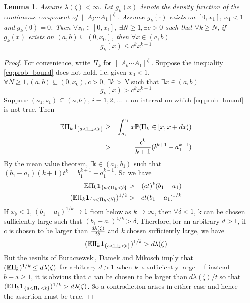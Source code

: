 \documentclass{article}
\newtheorem{lemma}{Lemma}
\theoremstyle{remark}
\begin{document}
\begin{lemma}\label{lemma:prob_bound}
  Assume $\lambda(\zeta) < \infty$. Let $g_k(x)$ denote the density
  function of the continuous component of $\|A_k \cdots A_1\|^\zeta$.
  Assume $g_k(\cdot)$ exists on $[0, x_1]$, $x_1 < 1$ and $g_k(0) = 0$.
  Then $\forall x_0 \in [0, x_1]$, $\exists N \geq 1, \exists c > 0$
  such that $\forall k \geq N$, if $g_k(x)$ exists on $(a, b)
  \subseteq (0, x_0)$, then $\forall x \in (a, b)$
  \begin{equation}
    \label{eq:prob_bound}
    g_k(x) \leq c^k x^{k-1}
  \end{equation}
\end{lemma}

\begin{proof}
  For convenience, write $\Pi_k$ for $\|A_k \cdots A_1\|^\zeta$. Suppose
  the inequality \eqref{eq:prob_bound} does not hold, i.e. given
  $x_0 < 1$, $\forall N \geq 1, (a, b) \subseteq (0, x_0), c
  > 0$, $\exists k > N$ such that $\exists x \in  (a, b)$
  \begin{equation*}
    g_k(x) > c^k x^{k-1}
  \end{equation*}
  Suppose $(a_1, b_1) \subseteq (a, b)$, $i = 1, 2, \dots$ is
  an interval on which \eqref{eq:prob_bound} is not true. Then
  \begin{eqnarray*}
    \mathbb{E} \Pi_k \mathbf{1}_{\{a < \Pi_k < b\}} &\geq&
    \int_{a_1}^{b_1} x \mathbb{P}(\Pi_k \in [x, x+dx)) \\
    &>& {c^k \over k + 1} (b_1^{k+1} - a_1^{k+1})
  \end{eqnarray*}
  By the mean value theorem, $\exists t \in (a_1, b_1)$ such that
  $(b_1 - a_1)(k+1) t^k = b_1^{k+1} - a_1^{k+1}$. So we have
  \begin{eqnarray*}
    \mathbb{E} \Pi_k \mathbf{1}_{\{a < \Pi_k < b\}} &>& (c t)^k(b_1 - a_1) \\
    (\mathbb{E} \Pi_k \mathbf{1}_{\{a < \Pi_k < b\}})^{1/k} &>& c t (b_1 - a_1)^{1/k}
  \end{eqnarray*}
  If $x_0 < 1$, $(b_1 - a_1)^{1/k} \to 1$ from below as $k \to
  \infty$, then $\forall \delta < 1$, k can be chosen sufficiently
  large such that $(b_1 - a_1)^{1/k} > \delta$. Therefore, for an arbitrary
  $d > 1$, if $c$ is chosen to be larger than ${d\lambda(\zeta) \over
    t \delta}$ and $k$ chosen sufficiently large, we have
  \[
  (\mathbb{E} \Pi_k \mathbf{1}_{\{a < \Pi_k < b\}})^{1/k} > d \lambda(\zeta)
  \]
  But the results of Buraczewski, Damek and Mikosch imply
  that $(\mathbb{E} \Pi_k)^{1/k} \leq d \lambda(\zeta)$ for arbitrary $d > 1$
  when $k$ is sufficiently large \cite{BuraczewskiDamekMikosch2015}.
  If instead $b - a \geq 1$, it is obvious that $c$ can be chosen to
  be larger than $d\lambda(\zeta)/t$ so that $(\mathbb{E} \Pi_k \mathbf{1}_{\{a < \Pi_k
    < b\}})^{1/k} > d\lambda(\zeta)$.  So a contradiction arises in
  either case and hence the assertion must be true.
\end{proof}
\end{document}
